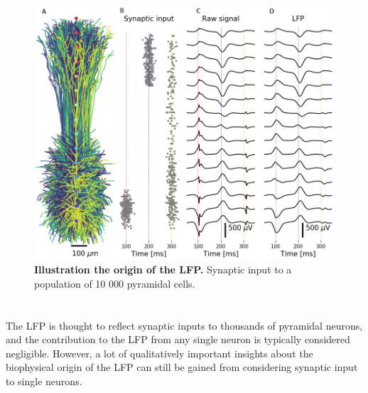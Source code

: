 \begin{figure}[!ht]
\begin{center}
\includegraphics[width=.7\textwidth]{Figures/LFP/population_LFP.png}
\end{center}
\caption{\textbf{Illustration the origin of the LFP.}
Synaptic input to a population of 10 000 pyramidal cells.
}
\label{fig:LFP:LFP_pop_origin}
\end{figure}







\section{}
The LFP is thought to reflect synaptic inputs to thousands of pyramidal neurons, and the contribution to the LFP from any single neuron is typically considered negligible. However, a lot of qualitatively important insights about the biophysical origin of the LFP can still be gained from considering synaptic input to single neurons. 

